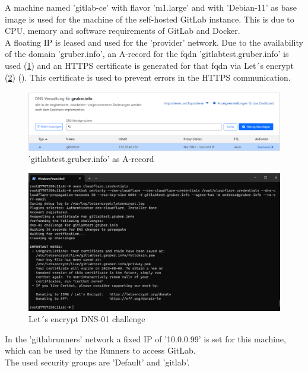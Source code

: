 A machine named 'gitlab-ce' with flavor 'm1.large' and with 'Debian-11' as base image is used for the machine of the self-hosted GitLab instance.
This is due to CPU, memory and software requirements of GitLab and Docker.\\

A floating IP is leased and used for the 'provider' network.
Due to the availability of the domain 'gruber.info', an A-record for the \ac{fqdn} 'gitlabtest.gruber.info' is used (\ref{fig:a_record}) and an HTTPS certificate is generated for that \ac{fqdn} via Let´s encrypt (\ref{fig:lets_encrypt}) (\cite{refCloudflareCertbot}).
This certificate is used to prevent errors in the HTTPS communication.
\begin{figure}[H]
	\centering
	\includegraphics[width=14cm]{images/a-record.png}
	\caption{'gitlabtest.gruber.info' as A-record}
	\label{fig:a_record}
\end{figure}

\begin{figure}[H]
	\centering
	\includegraphics[width=14cm]{images/lets_encrypt.png}
	\caption{Let´s encrypt DNS-01 challenge}
	\label{fig:lets_encrypt}
\end{figure}

In the 'gitlabrunners' network a fixed IP of '10.0.0.99' is set for this machine, which can be used by the Runners to access GitLab.\\

The used security groups are 'Default' and 'gitlab'.\\

